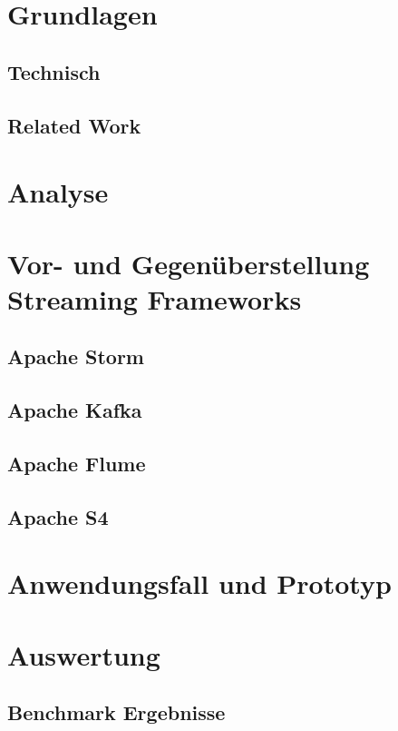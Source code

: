 \documentclass[11pt, a4paper]{book}
\begin{document}
\pagestyle{fancy}






\chapter{Grundlagen}
\section{Technisch}
\section{Related Work}

\chapter{Analyse}

\chapter{Vor- und Gegenüberstellung Streaming Frameworks}
\section{Apache Storm}
\section{Apache Kafka}
\section{Apache Flume}
\section{Apache S4}

\chapter{Anwendungsfall und Prototyp}

\chapter{Auswertung}
\section{Benchmark Ergebnisse}
\end{document}
